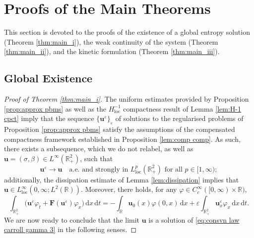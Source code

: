 \documentclass[11pt,a4paper,reqno]{amsart}
\numberwithin{equation}{section}
\theoremstyle{definition}
\theoremstyle{remark}
\newcommand{\bu}{\mathbf{u}}
\newcommand{\bF}{\mathbf{F}}
\renewcommand{\d}{\, \mathrm{d}}
\newcommand{\loc}{\mathrm{loc}}
\begin{document}
{\section{Proofs of the Main Theorems}\label{sec:proofs of global exis and weak conti}

This section is devoted to the proofs of the existence of a global entropy solution (Theorem \ref{thm:main_i}), the weak continuity of the system (Theorem \ref{thm:main_ii}), and the kinetic formulation (Theorem \ref{thm:main_iii}). 

\subsection{Global Existence}\label{sec:global exist}






\begin{proof}[Proof of Theorem \ref{thm:main_i}]

The uniform estimates provided by Proposition \ref{prop:approx pbms} as well as the $H^{-1}_\loc$ compactness result of Lemma \ref{lem:H-1 cpct} imply that the sequence $\{\bu^\varepsilon\}_\varepsilon$ of solutions to the regularised problems of Proposition \ref{prop:approx pbms} satisfy the assumptions of the compensated compactness framework established in Proposition \ref{lem:comp comp}. As such, there exists a subsequence, which we do not relabel, as well as $\bu = (\sigma,\beta) \in L^\infty(\mathbb{R}^2_+)$, such that 
\begin{equation}\label{eq:convergence for global existence proof}
    \bu^\varepsilon \to \bu \quad \text{a.e.~and strongly in $L^p_{\loc}(\mathbb{R}^2_+)$ for all } p \in [1,\infty); 
\end{equation}
additionally, the dissipation estimate of Lemma \ref{lem:dissipation} implies that $ \bu \in L^\infty_{\loc}(0,\infty;L^2(\mathbb{R}))$. Moreover, there holds, for any $\varphi \in C^\infty_c([0,\infty)\times\mathbb{R})$, 
\begin{equation*}
    \int_{\mathbb{R}^2_+} \big( \bu^\varepsilon \varphi_t + \bF(\bu^\varepsilon) \varphi_x \big) \d x \d t = -\int_\mathbb{R} \bu_0(x) \varphi(0,x) \d x + \varepsilon \int_{\mathbb{R}^2_+} \bu^\varepsilon_x \varphi_x \d x \d t. 
\end{equation*}
We are now ready to conclude that the limit $\bu$ is a solution of \eqref{eq:consvn law carroll gamma 3} in the following senses.



\end{proof}}
\end{document}
